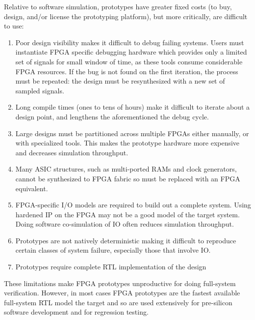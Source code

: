 Relative to software simulation, prototypes have greater fixed costs (to buy, design, and/or license the 
prototyping platform), but more critically, are difficult to use:
\begin{enumerate}
    \item Poor design visibility makes it difficult to debug failing systems. Users must instantiate
        FPGA specific debugging hardware which provides only a limited set of
        signals for small window of time, as these tools consume considerable
        FPGA resources.  If the bug is not found on the first iteration, the
        process must be repeated: the design must be resynthesized with a new
        set of sampled signals.

    \item Long compile times (ones to tens of hours) make it difficult to
        iterate about a design point, and lengthens the aforementioned the debug cycle.

    \item Large designs must be partitioned across multiple FPGAs either
        manually, or with specialized tools. This makes the prototype hardware
        more expensive and decreases simulation throughput.

    \item Many ASIC structures, such as multi-ported RAMs and clock generators,
        cannot be synthesized to FPGA fabric so must be replaced with an FPGA
        equivalent.

    \item FPGA-specific I/O models are required to build out a complete system. Using hardened
        IP on the FPGA may not be a good model of the target system. Doing software co-simulation of IO
        often reduces simulation throughput.

    \item Prototypes are not natively deterministic making it difficult to
        reproduce certain classes of system failure, especially those that
        involve IO.

    \item Prototypes require complete RTL implementation of the design
\end{enumerate}

These limitations make FPGA prototypes unproductive for doing full-system
verification. However, in most cases FPGA prototypes are the fastest available
full-system RTL model the target and so are used extensively for
pre-silicon software development and for regression testing.

